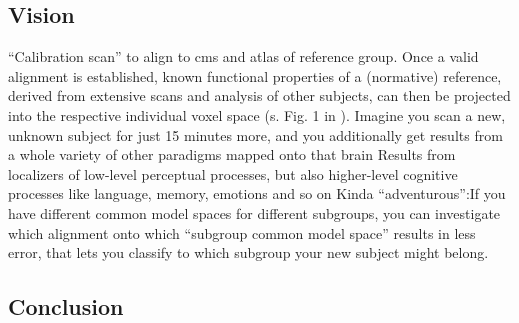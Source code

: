 \subsection{Vision}

``Calibration scan'' to align to \ac{cms} and atlas of reference group.
%
Once a valid alignment is established, known functional properties of a
(normative) reference, derived from extensive scans and analysis of other
subjects, can then be projected into the respective individual voxel space (s.
Fig. 1 in \citep{nishimoto2016lining}).
%
Imagine you scan a new, unknown subject for just 15 minutes more, and you
additionally get results from a whole variety of other paradigms mapped onto
that brain
%
Results from localizers of low-level perceptual processes, but also higher-level
cognitive processes like language, memory, emotions and so on
%
Kinda ``adventurous'':If you have different common model spaces for different
subgroups, you can investigate which alignment onto which ``subgroup common
model space'' results in less error, that lets you classify to which subgroup
your new subject might belong.


\subsection{Conclusion}
